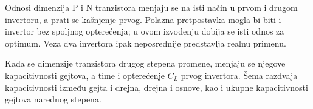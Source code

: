 Odnosi dimenzija P i N tranzistora menjaju se na isti način u prvom i drugom invertoru, a prati se kašnjenje prvog. Polazna pretpostavka mogla bi biti i invertor bez spoljnog opterećenja; u ovom izvođenju dobija se isti odnos za optimum. Veza dva invertora ipak neposrednije predstavlja realnu primenu.

Kada se dimenzije tranzistora drugog stepena promene, menjaju se njegove kapacitivnosti gejtova, a time i opterećenje $C_L$ prvog invertora. Šema razdvaja kapacitivnosti između gejta i drejna, drejna i osnove, kao i ukupne kapacitivnosti gejtova narednog stepena.
